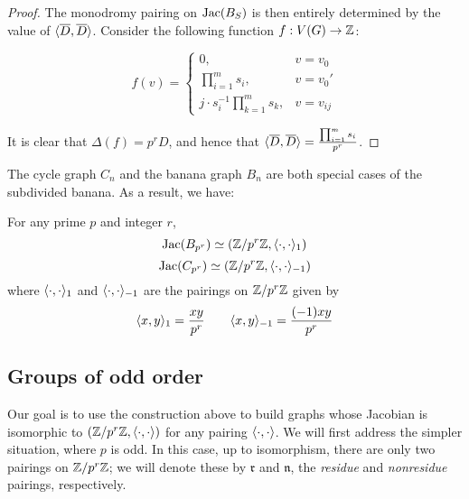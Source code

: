 \documentclass{amsart}
\begin{document}
\begin{proof}
  The monodromy pairing on $\operatorname{Jac}(B_S)$ is then entirely determined by
  the value of $\langle \overline{D}, \overline{D} \rangle$. Consider the
  following function $f:V(G) \to \mathbb{Z}$:

  \begin{equation*}
    f(v) = 
    \begin{cases}
      0, & v = v_0 \\
      \prod_{i=1}^ms_i, & v = v_0' \\
      j \cdot s_i^{-1}\prod_{k=1}^ms_k, & v = v_{ij}
    \end{cases}
  \end{equation*}

  It is clear that $\Delta(f) = p^rD$, and hence that
  $\langle \overline{D}, \overline{D} \rangle = \frac{\prod_{i=1}^ms_i}{p^r}$.
\end{proof}

The cycle graph $C_n$ and the banana graph $B_n$ are both special
cases of the subdivided banana. As a result, we have:

\begin{cor}
  For any prime $p$ and integer $r$, 
  \begin{equation*}
    \operatorname{Jac}(B_{p^r}) \simeq (\mathbb{Z}/p^r\mathbb{Z}, \langle \cdot, \cdot \rangle_1)
  \end{equation*}
  \begin{equation*}
    \operatorname{Jac}(C_{p^r}) \simeq (\mathbb{Z}/p^r\mathbb{Z}, \langle \cdot, \cdot \rangle_{-1})
  \end{equation*}
  where $\langle \cdot, \cdot \rangle_1$ and $\langle \cdot, \cdot \rangle_{-1}$ are the
  pairings on $\mathbb{Z}/p^r\mathbb{Z}$ given by
  \begin{equation*}
    \langle x, y \rangle_1 = \frac{xy}{p^r} \qquad \langle x, y \rangle_{-1} = \frac{(-1)xy}{p^r}
  \end{equation*}
\end{cor}

\subsection{Groups of odd order}
\label{sec:odd_groups}

Our goal is to use the construction above to build graphs whose
Jacobian is isomorphic to $(\mathbb{Z}/p^r\mathbb{Z}, \langle \cdot, \cdot \rangle)$ for any
pairing $\langle \cdot, \cdot \rangle$. We will first address the simpler
situation, where $p$ is odd. In this case, up to isomorphism, there
are only two pairings on $\mathbb{Z}/p^r\mathbb{Z}$; we will denote these by
$\mathfrak{r}$ and $\mathfrak{n}$, the \emph{residue} and
\emph{nonresidue} pairings, respectively.
\end{document}
